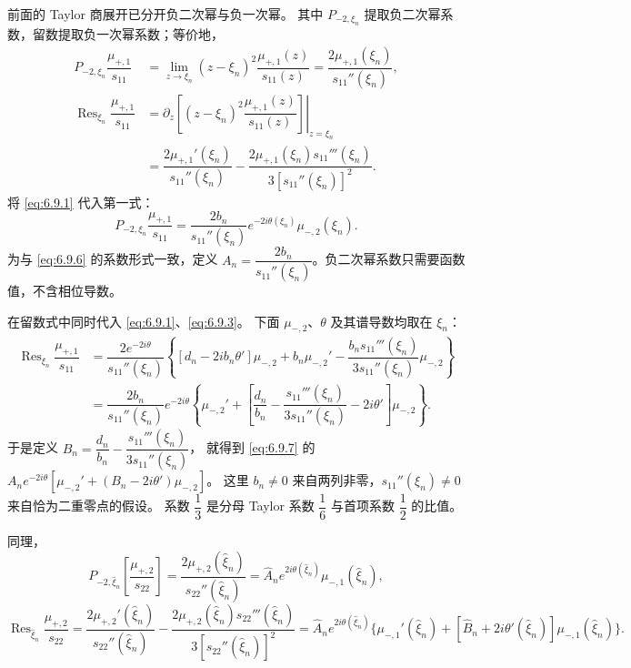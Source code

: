 \documentclass[lang=cn,scheme=chinese,mode=simple,device=normal,color=blue,
math=cm,thmcnt=section,12pt]{elegantbook}
\DeclareMathOperator*{\Res}{Res}
\newcommand{\eqq}[2]{\tag{#1}\label{eq:#1}#2}
\begin{document}
\begin{callout}[计算：(6.9.6)、(6.9.7) 及 $A_n,B_n$ 的推导]
    前面的 Taylor 商展开已分开负二次幂与负一次幂。
    其中 $P_{-2,\xi_n}$ 提取负二次幂系数，留数提取负一次幂系数；等价地，
    \[
        \begin{aligned}
            P_{-2,\xi_n}\dfrac{\mu_{+,1}}{s_{11}}
             & =\lim\limits_{z\to\xi_n}(z-\xi_n)^2\dfrac{\mu_{+,1}(z)}{s_{11}(z)}
            =\dfrac{2\mu_{+,1}(\xi_n)}{s_{11}''(\xi_n)},                                                 \\
            \Res_{\xi_n}\dfrac{\mu_{+,1}}{s_{11}}
             & =\left.\partial_z\left[(z-\xi_n)^2\dfrac{\mu_{+,1}(z)}{s_{11}(z)}\right]\right|_{z=\xi_n} \\
             & =\dfrac{2\mu_{+,1}'(\xi_n)}{s_{11}''(\xi_n)}
            -\dfrac{2\mu_{+,1}(\xi_n)s_{11}'''(\xi_n)}{3[s_{11}''(\xi_n)]^2}.
        \end{aligned}
    \]
    将 \eqref{eq:6.9.1} 代入第一式：
    \[
        P_{-2,\xi_n}\dfrac{\mu_{+,1}}{s_{11}}
        =\dfrac{2b_n}{s_{11}''(\xi_n)}e^{-2i\theta(\xi_n)}\mu_{-,2}(\xi_n).
    \]
    为与 \eqref{eq:6.9.6} 的系数形式一致，定义
    $A_n=\dfrac{2b_n}{s_{11}''(\xi_n)}$。负二次幂系数只需要函数值，不含相位导数。

    在留数式中同时代入 \eqref{eq:6.9.1}、\eqref{eq:6.9.3}。
    下面 $\mu_{-,2}$、$\theta$ 及其谱导数均取在 $\xi_n$：
    \[
        \begin{aligned}
            \Res_{\xi_n}\dfrac{\mu_{+,1}}{s_{11}}
             & =\dfrac{2e^{-2i\theta}}{s_{11}''(\xi_n)}
            \left\{[d_n-2ib_n\theta']\mu_{-,2}+b_n\mu_{-,2}'
            -\dfrac{b_ns_{11}'''(\xi_n)}{3s_{11}''(\xi_n)}\mu_{-,2}\right\} \\
             & =\dfrac{2b_n}{s_{11}''(\xi_n)}e^{-2i\theta}
            \left\{\mu_{-,2}'+\left[\dfrac{d_n}{b_n}-\dfrac{s_{11}'''(\xi_n)}{3s_{11}''(\xi_n)}-2i\theta'\right]\mu_{-,2}\right\}.
        \end{aligned}
    \]
    于是定义
    $B_n=\dfrac{d_n}{b_n}-\dfrac{s_{11}'''(\xi_n)}{3s_{11}''(\xi_n)}$，
    就得到 \eqref{eq:6.9.7} 的 $A_ne^{-2i\theta}[\mu_{-,2}'+(B_n-2i\theta')\mu_{-,2}]$。
    这里 $b_n\ne0$ 来自两列非零，$s_{11}''(\xi_n)\ne0$ 来自恰为二重零点的假设。
    系数 $\dfrac{1}{3}$ 是分母 Taylor 系数 $\dfrac{1}{6}$ 与首项系数 $\dfrac{1}{2}$ 的比值。
\end{callout}

同理，
\begin{equation}\eqq{6.9.8}{P_{-2,\widehat\xi_n}\left[\dfrac{\mu_{+,2}}{s_{22}}\right]
        =\dfrac{2\mu_{+,2}(\widehat\xi_n)}{s_{22}''(\widehat\xi_n)}
        =\widehat A_ne^{2i\theta(\widehat\xi_n)}\mu_{-,1}(\widehat\xi_n),}\end{equation}
\begin{equation}
    \eqq{6.9.9}{\Res_{\widehat\xi_n}\dfrac{\mu_{+,2}}{s_{22}}
    =\dfrac{2\mu_{+,2}'(\widehat\xi_n)}{s_{22}''(\widehat\xi_n)}-\dfrac{2\mu_{+,2}(\widehat\xi_n)s_{22}'''(\widehat\xi_n)}{3[s_{22}''(\widehat\xi_n)]^2}
    =\widehat A_ne^{2i\theta(\widehat\xi_n)}
    \{\mu_{-,1}'(\widehat\xi_n)+[\widehat B_n+2i\theta'(\widehat\xi_n)]\mu_{-,1}(\widehat\xi_n)\}.}
\end{equation}
\end{document}
